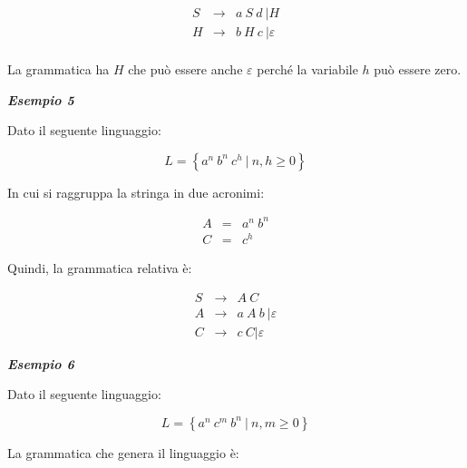 \documentclass[a4paper]{article}
\begin{document}
	\begin{equation*}
		\begin{array}{lll}
			S & \longrightarrow & a \: S \: d \: |H \\
			H & \longrightarrow & b \: H \: c \: |\varepsilon \\
		\end{array}
	\end{equation*}
	
	\noindent
	La grammatica ha $H$ che può essere anche $\varepsilon$ perché la variabile $h$ può essere zero.\newline
	
	\noindent
	\textcolor{Green4}{\textbf{\emph{Esempio 5}}}
	
	\noindent
	Dato il seguente linguaggio:
	
	\begin{equation*}
		L = \left\{a^{n} \: b^{n} \: c^{h} \: \left| \: n,h \ge 0\right.\right\}
	\end{equation*}

	\noindent
	In cui si raggruppa la stringa in due acronimi:
	
	\begin{equation*}
		\begin{array}{lll}
			A & = & a^{n} \: b^{n} \\
			C & = & c^{h}
		\end{array}
	\end{equation*}

	\noindent
	Quindi, la grammatica relativa è:
	
	\begin{equation*}
		\begin{array}{lll}
			S & \longrightarrow & A \: C \\
			A & \longrightarrow & a \: A \: b \: | \varepsilon \\
			C & \longrightarrow & c \: C | \varepsilon
		\end{array}
	\end{equation*}
	\:\newline
	
	\noindent
	\textcolor{Green4}{\textbf{\emph{Esempio 6}}}
	
	\noindent
	Dato il seguente linguaggio:
	
	\begin{equation*}
		L = \left\{a^{n} \: c^{m} \: b^{n} \: \left| \: n,m \ge 0\right.\right\}
	\end{equation*}

	\noindent
	La grammatica che genera il linguaggio è:
	
\end{document}
